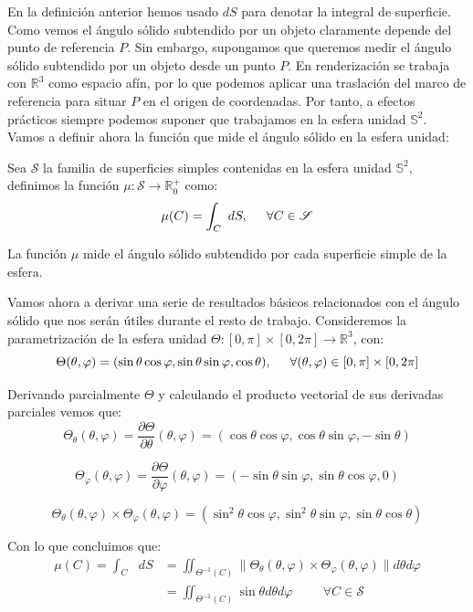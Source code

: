 En la definición anterior hemos usado $dS$ para denotar la integral de superficie. Como vemos el ángulo sólido subtendido por un objeto claramente depende del punto de referencia $P$. Sin embargo, supongamos que queremos medir el ángulo sólido subtendido por un objeto desde un punto $P$. En renderización se trabaja con $\mathds{R}^3$ como espacio afín, por lo que podemos aplicar una traslación del marco de referencia para situar $P$ en el origen de coordenadas. Por tanto, a efectos prácticos siempre podemos suponer que trabajamos en la esfera unidad $\mathds{S}^2$. Vamos a definir ahora la función que mide el ángulo sólido en la esfera unidad:

\begin{definicion}
  Sea $\mathscr{S}$ la familia de superficies simples contenidas en la esfera unidad $\mathds {S}^2$, definimos la función $\mu :\mathscr{S} \rightarrow \mathds{R}^+_0$ como:
  $$\mu(C) = \int_C \text{ }dS , \hspace{0.5cm} \forall C\in \mathscr{S}$$

  La función $\mu$ mide el ángulo sólido subtendido por cada superficie simple de la esfera.
\end{definicion}

Vamos ahora a derivar una serie de resultados básicos relacionados con el ángulo sólido que nos serán útiles durante el resto de trabajo. Consideremos la parametrización de la esfera unidad $\Theta:[0,\pi ]\times [0,2\pi ]\rightarrow \mathds{R}^3$, con:
$$\Theta(\theta ,\varphi ) = ( \sin \theta \cos \varphi,  \sin \theta \sin \varphi , \cos \theta),\hspace{0.5cm}  \forall (\theta , \varphi)\in [0,\pi ]\times [0,2\pi ]$$

Derivando parcialmente $\Theta$ y calculando el producto vectorial de sus derivadas parciales vemos que:
$$\Theta _\theta(\theta ,\varphi ) = \frac{\partial \Theta}{\partial \theta}(\theta ,\varphi ) = (\cos\theta\cos\varphi, \cos\theta\sin\varphi, -\sin\theta)$$

$$\Theta _\varphi(\theta ,\varphi ) = \frac{\partial \Theta}{\partial \varphi}(\theta ,\varphi ) = (-\sin\theta\sin\varphi, \sin\theta\cos\varphi, 0)$$

$$\Theta _\theta(\theta ,\varphi )\times \Theta _\varphi(\theta ,\varphi ) = (\sin^2\theta\cos\varphi,\sin^2\theta\sin\varphi,\sin\theta\cos\theta)$$

Con lo que concluimos que:
\begin{align*}
\mu (C) = \int_C \text{ }dS &= \iint_{\Theta^{-1}(C)}\|\Theta _\theta(\theta ,\varphi )\times \Theta _\varphi(\theta ,\varphi )\| d\theta d\varphi \\
&= \iint_{\Theta^{-1}(C)} \sin\theta d\theta d\varphi \hspace{1cm} \forall C \in \mathscr{S}
\end{align*}

